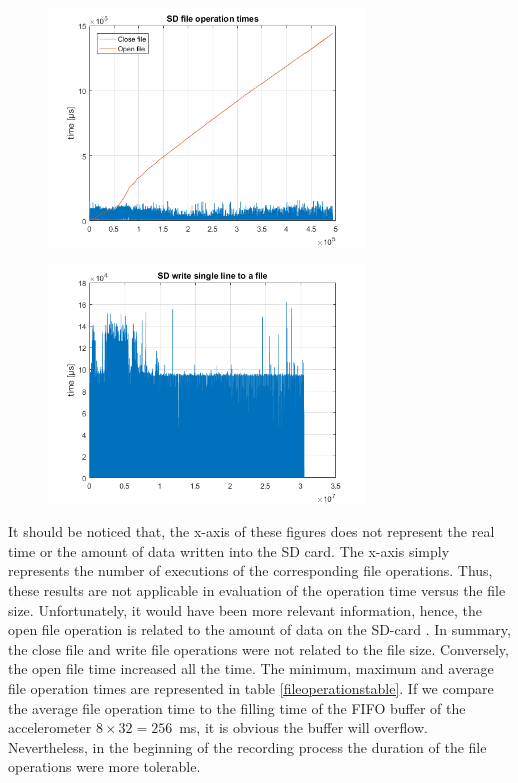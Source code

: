 \documentclass[english,12pt,a4paper,pdftex,elec,utf8]{aaltothesis}
\begin{document}
\begin{figure}[h]
\centering
\includegraphics[width = 0.75\textwidth]{figures/openclosetimes_vanha.png}
\caption{} \label{openclosetimes_old}
\end{figure}

\begin{figure}[h]
\centering
\includegraphics[width = 0.75\textwidth]{figures/writetimes_vanharauta.png}
\caption{} \label{writetimes_old}
\end{figure}

It should be noticed that, the x-axis of these figures does not represent the real time or the amount of data written into the SD card. The x-axis simply represents the number of executions of the corresponding file operations. Thus, these results are not applicable in evaluation of the operation time versus the file size. Unfortunately, it would have been more relevant information, hence, the open file operation is related to the amount of data on the SD-card \cite{spimanual}. In summary, the close file and write file operations were not related to the file size. Conversely, the open file time increased all the time. The minimum, maximum and average file operation times are represented in table \ref{fileoperationstable}. If we compare the average file operation time to the filling time of the FIFO buffer of the accelerometer $8 \times 32=256$\SI{}{\milli\second}, it is obvious the buffer will overflow. Nevertheless, in the beginning of the recording process the duration of the file operations were more tolerable.
\end{document}
